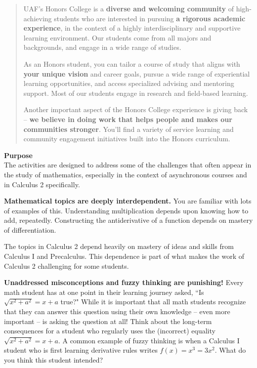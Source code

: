 \documentclass[12pt]{article}
\renewcommand{\emph}[1]{\textsf{\textbf{#1}}}
\newcommand{\localhead}[1]{\par\smallskip\textbf{#1} \smallskip\nobreak\\}%
\def\heading#1{\localhead{\large\emph{#1}}}
\begin{document}
\begin{quote} 
UAF's Honors College is a \textbf{diverse and welcoming community} of high-achieving students who are interested in pursuing \textbf{a rigorous academic experience}, in the context of a highly interdisciplinary and supportive learning environment. Our students come from all majors and backgrounds, and engage in a wide range of studies.

As an Honors student, you can tailor a course of study that aligns with \textbf{your unique vision} and career goals, pursue a wide range of experiential learning opportunities, and access specialized advising and mentoring support. Most of our students engage in research and field-based learning.

Another important aspect of the Honors College experience is {giving back} -- \textbf{we believe in doing work that helps people and makes our communities stronger}. You'll find a variety of  {service learning and community engagement} initiatives built into the Honors curriculum.
\end{quote}

\heading{Purpose}
The activities are designed to address some of the challenges that often appear in the study of mathematics, especially in the context of asynchronous courses and in Calculus 2 specifically.

\textbf{Mathematical topics are deeply interdependent.} You are familiar with lots of examples of this. Understanding multiplication depends upon knowing how to add, repeatedly. Constructing the antiderivative of a function depends on mastery of differentiation. 

The topics in Calculus 2 depend heavily on mastery of ideas and skills from Calculus I and Precalculus. This dependence is part of what makes the work of Calculus 2 challenging for some students.

\textbf{Unaddressed misconceptions and fuzzy thinking are punishing!}  Every math student has at one point in their learning journey asked, ``Is $\sqrt{x^2+a^2}=x+a$ true?" While it is important that all math students recognize that they can answer this question using their own knowledge -- even more important -- is asking the question at all! Think about the long-term consequences for a student who regularly uses the (incorrect) equality $\sqrt{x^2+a^2}=x+a.$ A common example of fuzzy thinking is when a Calculus I student who is first learning derivative rules writes $f(x)=x^3=3x^2.$ What do you think this student intended?
\end{document}
